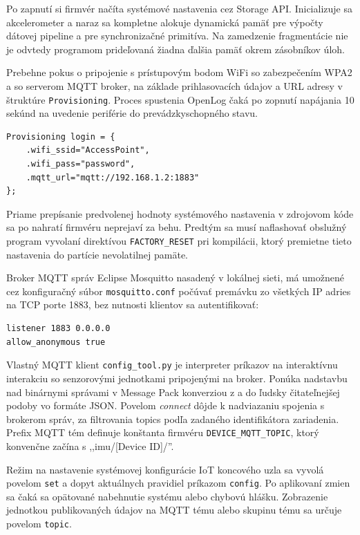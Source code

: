 Po zapnutí si firmvér načíta systémové nastavenia cez Storage API. Inicializuje sa
akcelerometer a naraz sa kompletne alokuje dynamická pamäť pre výpočty dátovej pipeline a pre synchronizačné primitíva.
Na zamedzenie fragmentácie nie je odvtedy programom prideľovaná žiadna ďalšia pamäť okrem zásobníkov úloh.

Prebehne pokus o pripojenie s prístupovým bodom WiFi so zabezpečením WPA2 a so serverom MQTT broker, na základe prihlasovacích údajov
a URL adresy v štruktúre \verb|Provisioning|. Proces spustenia OpenLog čaká po zopnutí napájania 10 sekúnd na uvedenie
periférie do prevádzkyschopného stavu.
\begin{small}
\begin{Verbatim}[frame=single, baselinestretch=1.1]
Provisioning login = {
    .wifi_ssid="AccessPoint",
    .wifi_pass="password",
    .mqtt_url="mqtt://192.168.1.2:1883"
};
\end{Verbatim}
\end{small}

Priame prepísanie predvolenej hodnoty systémového nastavenia v zdrojovom kóde
sa po nahratí firmvéru neprejaví za behu. Predtým sa musí naflashovať obslužný program vyvolaní direktívou
\verb|FACTORY_RESET| pri kompilácii, ktorý premietne tieto nastavenia do partície nevolatilnej pamäte.

Broker MQTT správ Eclipse Mosquitto nasadený v lokálnej sieti, má umožnené cez konfiguračný súbor \verb|mosquitto.conf| počúvať
premávku zo všetkých IP adries na TCP porte 1883, bez nutnosti klientov sa autentifikovať:
\begin{small}
\begin{Verbatim}[frame=single, baselinestretch=1.1]
listener 1883 0.0.0.0
allow_anonymous true
\end{Verbatim}
\end{small}

Vlastný MQTT klient \verb|config_tool.py| je interpreter príkazov na interaktívnu interakciu so senzorovými jednotkami
pripojenými na broker. Ponúka nadstavbu nad binárnymi správami v Message Pack konverziou z a do ľudsky čitateľnejšej
podoby vo formáte JSON. Povelom \emph{connect} dôjde k nadviazaniu spojenia s brokerom správ, za filtrovania topics podľa
zadaného identifikátora zariadenia. Prefix MQTT tém definuje konštanta firmvéru \verb|DEVICE_MQTT_TOPIC|, ktorý konvenčne začína
s ,,imu/[Device ID]/''.

Režim na nastavenie systémovej konfigurácie IoT koncového uzla sa vyvolá povelom \verb|set| a dopyt aktuálnych pravidiel
príkazom \verb|config|. Po aplikovaní zmien sa čaká sa opätované nabehnutie systému alebo chybovú hlášku.
Zobrazenie jednotkou publikovaných údajov na MQTT tému alebo skupinu tému sa určuje povelom \verb|topic|.

